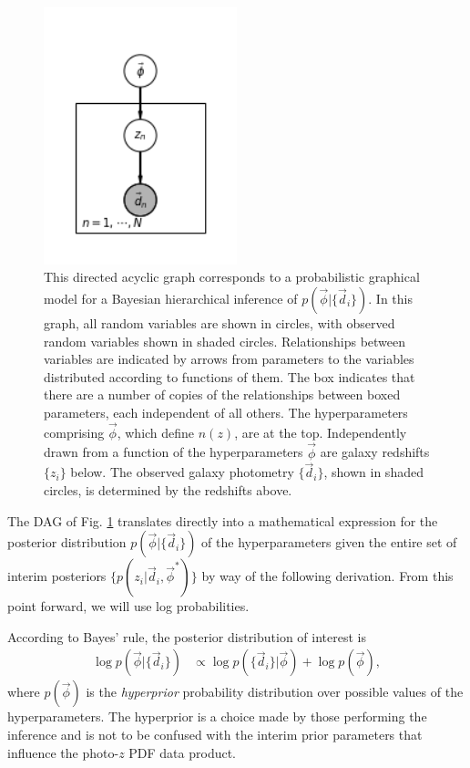 \documentclass[iop]{emulateapj}
\begin{document}
\begin{figure}
	\begin{center}
		\includegraphics[width=0.5\textwidth]{pgm.png}
		\caption{This directed acyclic graph corresponds to a 
probabilistic graphical model for a Bayesian hierarchical inference of 
$p(\vec{\phi}|\{\vec{d}_{i}\})$.  In this graph, all random variables are shown 
in circles, with observed random variables shown in shaded circles.  
Relationships between variables are indicated by arrows from parameters to the 
variables distributed according to functions of them.  The box indicates that 
there are a number of copies of the relationships between boxed parameters, 
each independent of all others.  The hyperparameters comprising $\vec{\phi}$, 
which define $n(z)$, are at the top.  Independently drawn from a function of 
the hyperparameters $\vec{\phi}$ are galaxy redshifts $\{z_{i}\}$ below.  The 
observed galaxy photometry $\{\vec{d}_{i}\}$, shown in shaded circles, is 
determined by the redshifts above.}
	\label{fig:pgm}
	\end{center}
\end{figure}



The DAG of Fig. \ref{fig:pgm} translates directly into a mathematical 
expression for the posterior distribution $p(\vec{\phi} | \{\vec{d}_{i}\})$ of 
the hyperparameters given the entire set of interim posteriors $\{p(z_{i} | 
\vec{d}_{i}, \vec{\phi}^{*})\}$ by way of the following derivation.  From this 
point forward, we will use log probabilities.

According to Bayes' rule, the posterior distribution of interest is
\begin{align}
\log p(\vec{\phi} | \{\vec{d}_{i}\}) &\propto \log p(\{\vec{d}_{i}\} | 
\vec{\phi}) + \log p(\vec{\phi}),
\end{align}
where $p(\vec{\phi})$ is the \textit{hyperprior} probability distribution over 
possible values of the hyperparameters.  The hyperprior is a choice made by 
those performing the inference and is not to be confused with the interim prior 
parameters that influence the photo-$z$ PDF data product.
\end{document}
